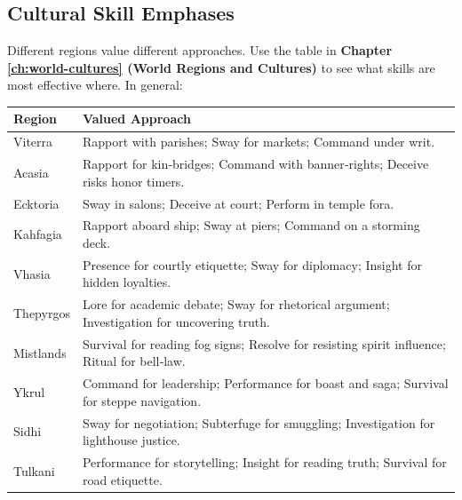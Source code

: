 \subsection*{Cultural Skill Emphases}
\label{sec:cultural-skills}
Different regions value different approaches. Use the table in \textbf{Chapter \ref{ch:world-cultures} (World Regions and Cultures)} to see what skills are most effective where. In general:

\begin{center}
\begin{longtable}{ll}
\toprule
\textbf{Region} & \textbf{Valued Approach} \\
\midrule
Viterra & Rapport with parishes; Sway for markets; Command under writ. \\
Acasia & Rapport for kin‑bridges; Command with banner‑rights; Deceive risks honor timers. \\
Ecktoria & Sway in salons; Deceive at court; Perform in temple fora. \\
Kahfagia & Rapport aboard ship; Sway at piers; Command on a storming deck. \\
Vhasia & Presence for courtly etiquette; Sway for diplomacy; Insight for hidden loyalties. \\
Thepyrgos & Lore for academic debate; Sway for rhetorical argument; Investigation for uncovering truth. \\
Mistlands & Survival for reading fog signs; Resolve for resisting spirit influence; Ritual for bell‑law. \\
Ykrul & Command for leadership; Performance for boast and saga; Survival for steppe navigation. \\
Sidhi & Sway for negotiation; Subterfuge for smuggling; Investigation for lighthouse justice. \\
Tulkani & Performance for storytelling; Insight for reading truth; Survival for road etiquette. \\
\bottomrule
\end{longtable}
\end{center}

